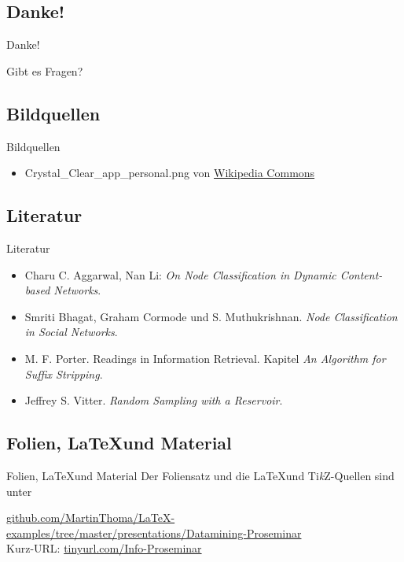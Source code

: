 \subsection{Danke!}
\begin{frame}{Danke!}
    \begin{center}
        \Huge
	    Gibt es Fragen?
    \end{center}
\end{frame}

\subsection{Bildquellen}
\begin{frame}{Bildquellen}
\begin{itemize}
	\item Crystal\_Clear\_app\_personal.png von \href{https://commons.wikimedia.org/wiki/File:Crystal_Clear_app_personal.png}{Wikipedia Commons}
\end{itemize}
\end{frame}

\subsection{Literatur}
\begin{frame}{Literatur}
\begin{itemize}
    \item Charu C. Aggarwal, Nan Li: \textit{On Node Classification in Dynamic Content-based Networks}.
    \item Smriti Bhagat, Graham Cormode und S. Muthukrishnan. \textit{Node Classification in Social Networks}.
    \item M. F. Porter. Readings in Information Retrieval. Kapitel \textit{An Algorithm for Suffix Stripping}.
    \item Jeffrey S. Vitter. \textit{Random Sampling with a Reservoir}.
\end{itemize}
\end{frame}

\subsection{Folien, \LaTeX und Material}
\begin{frame}{Folien, \LaTeX und Material}
Der Foliensatz und die \LaTeX und Ti\textit{k}Z-Quellen sind unter

\href{https://github.com/MartinThoma/LaTeX-examples/tree/master/presentations/Datamining-Proseminar}{github.com/MartinThoma/LaTeX-examples/tree/master/presentations/Datamining-Proseminar}
\\

Kurz-URL:
\href{http://tinyurl.com/Info-Proseminar}{tinyurl.com/Info-Proseminar}
\end{frame}
